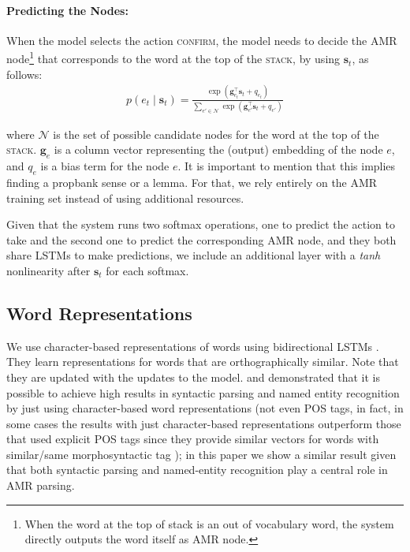 \documentclass[11pt,a4paper]{article}
\begin{document}
\paragraph{Predicting the Nodes:}
When the model selects the action \textsc{confirm}, the model needs to 
decide the AMR node\footnote{When the word at the top of stack is an out of vocabulary word, 
the system directly outputs the word itself as AMR node.} that corresponds to the word at the top 
of the \textsc{stack}, by using  $\mathbf{s}_t$, as follows:
\vspace{-0.15cm}
\begin{align}
p(e_t \mid \mathbf{s}_t) = \frac{\exp \left( \mathbf{g}_{e_t}^{\top}
\mathbf{s}_t + q_{e_t} \right)}{\sum_{e' \in \mathcal{N}} \exp \left(
\mathbf{g}_{e'}^{\top} \mathbf{s}_t + q_{e'} \right)}
\label{eq:local-objective}
\end{align}

\noindent where $\mathcal{N}$ is 
the set of possible candidate nodes for the word at the top of the \textsc{stack}.  $\mathbf{g}_e$ is a column 
vector representing the (output) embedding of the node $e$, and $q_e$ is a bias term for the node 
$e$.  It is important to mention that this implies finding a propbank sense or a lemma. For that, we 
rely entirely on the AMR training set instead of using additional resources.

Given that the system runs two softmax operations, one to predict the action to take and the second one 
to predict the corresponding AMR node, and they both share LSTMs to make predictions, we include 
an additional layer with a \emph{tanh} nonlinearity after $\mathbf{s}_t$ for 
each softmax. 


\subsection{Word Representations}

We use character-based representations
 of words using bidirectional LSTMs \cite{ling:2015,ballesteros-dyer-smith:2015:EMNLP}. They
  learn  representations for words that are orthographically similar. Note that they are updated with 
  the updates to the model.
   and   demonstrated 
   that it is possible to achieve high results in syntactic
  parsing and named entity recognition by just using character-based word representations 
  (not even POS tags, in fact, in some cases the results with just character-based representations
  outperform those that used explicit POS tags since they provide similar vectors for words with 
  similar/same morphosyntactic tag \cite{ballesteros-dyer-smith:2015:EMNLP});  in this paper we show 
  a similar result given that both syntactic parsing and named-entity recognition play a central role in AMR 
  parsing. 
\end{document}

